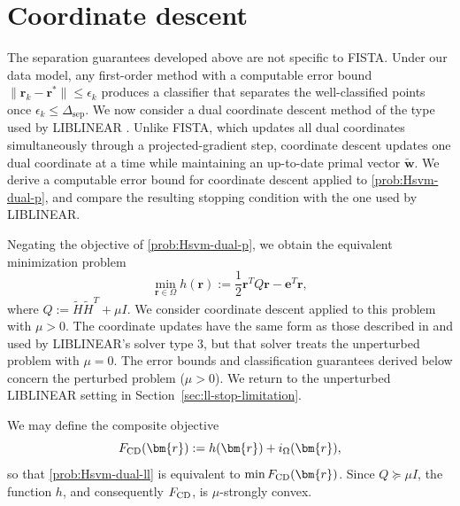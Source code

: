 \documentclass[twoside,11pt]{article}
\renewcommand\r{\bm{r}}
\newcommand\w{\bm{w}}
\newcommand\e{\bm{e}}
\newcommand\tw{\tilde{\w}}
\newcommand\tH{\tilde{H}}
\newcommand\sep{\mathrm{sep}}
\begin{document}
    \section{Coordinate descent} \label{sec:cd}
    The separation guarantees developed above are not specific to FISTA. Under our data model, any first-order method with a computable error bound $\|\r_k - \r^*\| \leq \epsilon_k$ produces a classifier that separates the well-classified points once $\epsilon_k \leq \Delta_{\sep}$. We now consider a dual coordinate descent method of the type used by LIBLINEAR \citep{LIBLINEAR2}. Unlike FISTA, which updates all dual coordinates simultaneously through a projected-gradient step, coordinate descent updates one dual coordinate at a time while maintaining an up-to-date primal vector $\tw$. We derive a computable error bound for coordinate descent applied to \eqref{prob:Hsvm-dual-p}, and compare the resulting stopping condition with the one used by LIBLINEAR.

    Negating the objective of \eqref{prob:Hsvm-dual-p}, we obtain the equivalent minimization problem
    \begin{equation} \label{prob:Hsvm-dual-ll}
        \min_{\r\in\Omega} h(\r) := \frac{1}{2}\r^TQ\r - \e^T\r,
    \end{equation}
    where $Q:=\tH\tH^T+\mu I$. We consider coordinate descent applied to this problem with $\mu > 0$. The coordinate updates have the same form as those described in \cite{LIBLINEAR2} and used by LIBLINEAR’s solver type $3$, but that solver treats the unperturbed problem with $\mu=0$. The error bounds and classification guarantees derived below concern the perturbed problem ($\mu > 0$). We return to the unperturbed LIBLINEAR setting in Section~\ref{sec:ll-stop-limitation}.

    We may define the composite objective
    \begin{equation} \label{prob:Hsvm-dual-ll-comp}
        F_{\rm CD}(\r) := h(\r) + i_{\Omega}(\r),
    \end{equation}
    so that \eqref{prob:Hsvm-dual-ll} is equivalent to $\min F_{\rm CD}(\r)$. Since $Q \succeq \mu I$, the function $h$, and consequently $F_{\rm CD}$, is $\mu$-strongly convex.
\end{document}
